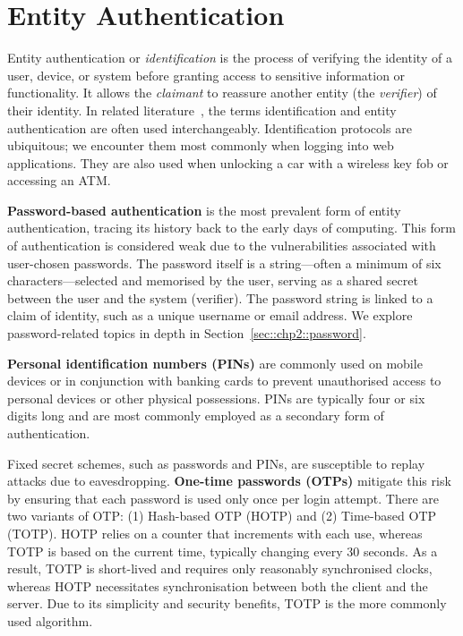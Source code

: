 \begin{figure}[t]
\end{figure}

\section{Entity Authentication}
\label{sec::chp2::authentication}

Entity authentication or \textit{identification} is the process of verifying the identity of a user, device, or system before granting access to sensitive information or functionality. It allows the \textit{claimant} to reassure another entity (the \textit{verifier}) of their identity. In related literature~\cite{menezes_handbook_1997}, the terms identification and entity authentication are often used interchangeably. Identification protocols are ubiquitous; we encounter them most commonly when logging into web applications. They are also used when unlocking a car with a wireless key fob or accessing an ATM.

\textbf{Password-based authentication} is the most prevalent form of entity authentication, tracing its history back to the early days of computing. This form of authentication is considered weak due to the vulnerabilities associated with user-chosen passwords. The password itself is a string—often a minimum of six characters—selected and memorised by the user, serving as a shared secret between the user and the system (verifier). The password string is linked to a claim of identity, such as a unique username or email address. We explore password-related topics in depth in Section~\ref{sec::chp2::password}.

\textbf{Personal identification numbers (PINs)} are commonly used on mobile devices or in conjunction with banking cards to prevent unauthorised access to personal devices or other physical possessions. PINs are typically four or six digits long and are most commonly employed as a secondary form of authentication.

Fixed secret schemes, such as passwords and PINs, are susceptible to replay attacks due to eavesdropping. \textbf{One-time passwords (OTPs)} mitigate this risk by ensuring that each password is used only once per login attempt. There are two variants of OTP: (1) Hash-based OTP (HOTP) and (2) Time-based OTP (TOTP). HOTP relies on a counter that increments with each use, whereas TOTP is based on the current time, typically changing every 30 seconds. As a result, TOTP is short-lived and requires only reasonably synchronised clocks, whereas HOTP necessitates synchronisation between both the client and the server. Due to its simplicity and security benefits, TOTP is the more commonly used algorithm.

